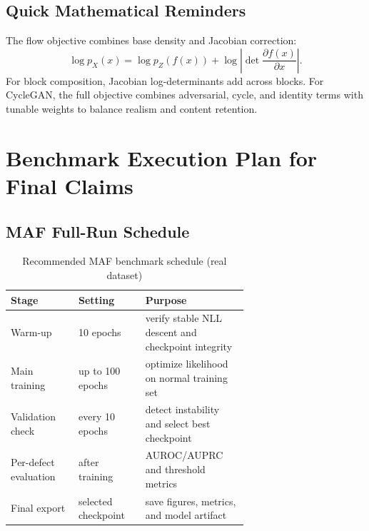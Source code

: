 \documentclass[conference]{IEEEtran}
\begin{document}
\subsection{Quick Mathematical Reminders}
The flow objective combines base density and Jacobian correction:
\begin{equation}
\log p_X(x)=\log p_Z(f(x))+\log\left|\det\frac{\partial f(x)}{\partial x}\right|.
\end{equation}
For block composition, Jacobian log-determinants add across blocks. For CycleGAN, the full objective combines adversarial, cycle, and identity terms with tunable weights to balance realism and content retention.

\section{Benchmark Execution Plan for Final Claims}
\subsection{MAF Full-Run Schedule}
\begin{table}[!t]
\centering
\small
\caption{Recommended MAF benchmark schedule (real dataset)}
\begin{tabular}{|p{0.22\linewidth}|p{0.18\linewidth}|p{0.26\linewidth}|}
\hline
\textbf{Stage} & \textbf{Setting} & \textbf{Purpose} \\
\hline
Warm-up & 10 epochs & verify stable NLL descent and checkpoint integrity \\
\hline
Main training & up to 100 epochs & optimize likelihood on normal training set \\
\hline
Validation check & every 10 epochs & detect instability and select best checkpoint \\
\hline
Per-defect evaluation & after training & AUROC/AUPRC and threshold metrics \\
\hline
Final export & selected checkpoint & save figures, metrics, and model artifact \\
\hline
\end{tabular}
\end{table}
\end{document}
